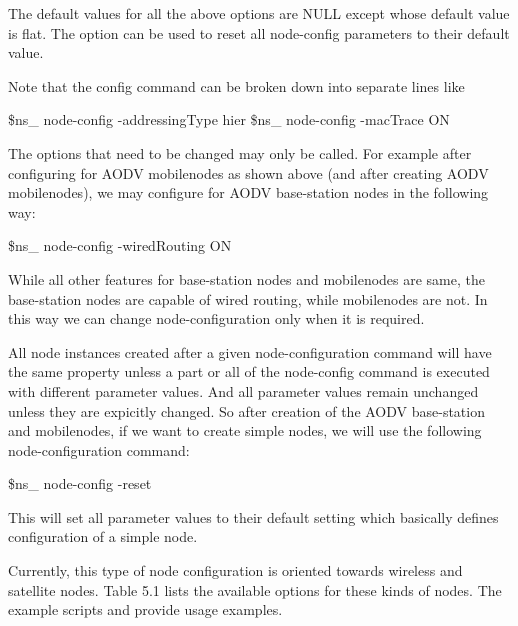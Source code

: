 The default values for all the above options are NULL except 
whose default value is flat. The option  can be used to reset all
node-config parameters to their default value.

Note that the config command can be broken down into separate lines like
\begin{program}
        \$ns_ node-config -addressingType hier
        \$ns_ node-config -macTrace ON
\end{program}
The options that need to be changed may only be called. For example after
configuring for AODV mobilenodes as shown above (and after creating AODV
mobilenodes), we may configure for AODV base-station nodes in the
following way: 
\begin{program}
        \$ns_ node-config -wiredRouting ON
\end{program}
While all other features for base-station nodes and mobilenodes are same,
the base-station nodes are capable of wired routing, while mobilenodes are
not. In this way we can change node-configuration only when it is required.

All node instances created after a given node-configuration command will
have the same property unless a part or all of the node-config command is
executed with different parameter values. And all parameter values remain
unchanged unless they are expicitly changed. So after creation of the AODV
base-station and mobilenodes, if we want to create simple nodes, we will
use the following node-configuration command:
\begin{program}
        \$ns_ node-config -reset
\end{program}
This will set all parameter values to their default setting which
basically defines configuration of a simple node.

Currently, this type of node configuration is oriented towards wireless
and satellite nodes.  Table 5.1
lists the available options
for these kinds of nodes.  The example scripts 
 and  provide
usage examples.

